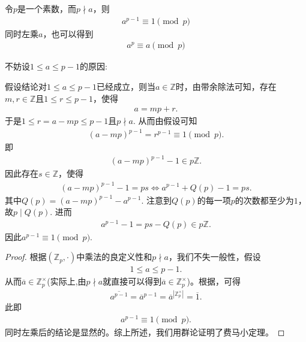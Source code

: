 \documentclass[../../main.tex]{subfiles}
\begin{document}
\begin{theorem}[Fermat小定理]\label{theorem:Fermat小定理}
令$p$是一个素数，而$p \nmid a$，则
\begin{align*}
a^{p - 1} \equiv 1 \pmod{p}
\end{align*}
同时左乘$a$，也可以得到
\begin{align*}
a^{p} \equiv a \pmod{p}
\end{align*}
\end{theorem}
\begin{note}
不妨设$1 \leqslant a \leqslant p - 1$的原因:

假设结论对$1 \leqslant a \leqslant p - 1$已经成立，则当$a \in \mathbb{Z}$时，由带余除法可知，存在$m, r \in \mathbb{Z}$且$1 \leqslant r \leqslant p - 1$，使得
\begin{align*}
a = mp + r.
\end{align*}
于是$1 \leqslant r = a - mp \leqslant p - 1$且$p \nmid a$. 从而由假设可知
\begin{align*}
(a - mp)^{p - 1} = r^{p - 1} \equiv 1 \pmod{p}.
\end{align*}
即
\begin{align*}
(a - mp)^{p - 1} - 1 \in p\mathbb{Z}.
\end{align*}
因此存在$s \in \mathbb{Z}$，使得
\begin{align*}
(a - mp)^{p - 1} - 1 = ps \iff a^{p - 1} + Q(p) - 1 = ps.
\end{align*}
其中$Q(p) = (a - mp)^{p - 1} - a^{p - 1}$. 注意到$Q(p)$的每一项$p$的次数都至少为$1$，故$p \mid Q(p)$. 进而
\begin{align*}
a^{p - 1} - 1 = ps - Q(p) \in p\mathbb{Z}.
\end{align*}
因此$a^{p - 1} \equiv 1 \pmod{p}$. 
\end{note}
\begin{proof}
根据$(\mathbb{Z}_p, \cdot)$中乘法的良定义性和$p \nmid a$，我们不失一般性，假设
\begin{align*}
1 \leqslant a \leqslant p - 1.
\end{align*}
从而$\overline{a} \in \mathbb{Z}_p^\times$(实际上,由$p \nmid a$就直接可以得到$\overline{a} \in \mathbb{Z}_p^\times$)。根据，可得
\begin{align*}
\overline{a^{p-1}}=\overline{a}^{p-1}=\overline{a}^{|\mathbb{Z}_p^\times|} = \overline{1}.
\end{align*}
此即
\begin{align*}
a^{p - 1} \equiv 1 \pmod{p}.
\end{align*}
同时左乘后的结论是显然的。综上所述，我们用群论证明了费马小定理。 

\end{proof}
\end{document}
